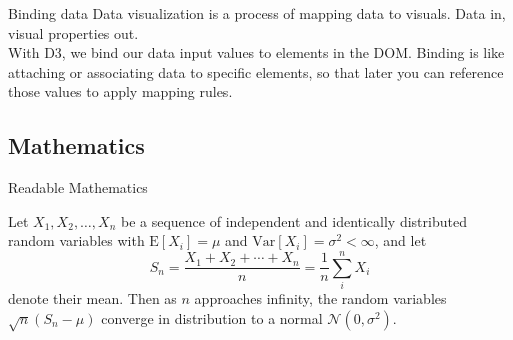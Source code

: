 \documentclass{beamer}
\begin{document}
\begin{frame}{Binding data}
Data visualization is a process of mapping data to visuals. Data in, visual properties out. \\
With D3, we bind our data input values to elements in the DOM. Binding is like attaching or associating data to specific elements, so that later you can reference those values to apply mapping rules.
\end{frame}

\subsection{Mathematics}

\begin{frame}{Readable Mathematics}

Let $X_1, X_2, \ldots, X_n$ be a sequence of independent and identically distributed random variables with $\text{E}[X_i] = \mu$ and $\text{Var}[X_i] = \sigma^2 < \infty$, and let
$$S_n = \frac{X_1 + X_2 + \cdots + X_n}{n}
      = \frac{1}{n}\sum_{i}^{n} X_i$$
denote their mean. Then as $n$ approaches infinity, the random variables $\sqrt{n}(S_n - \mu)$ converge in distribution to a normal $\mathcal{N}(0, \sigma^2)$.

\end{frame}
\end{document}
